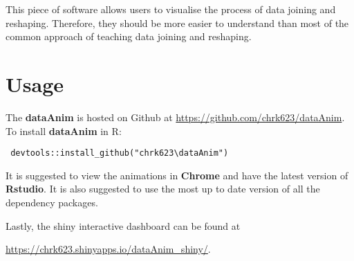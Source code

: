 This piece of software allows users to visualise the process of data joining and reshaping. Therefore, they should be more easier to understand than most of the common approach of teaching data joining and reshaping.


\newpage
\section{Usage}
The \textbf{dataAnim} is hosted on \textsf{Github} at \href{https://github.com/chrk623/dataAnim}{https://github.com/chrk623/dataAnim}. To install \textbf{dataAnim} in \textsf{R}:

\begin{lstlisting}
 devtools::install_github("chrk623\dataAnim")
\end{lstlisting}

It is suggested to view the animations in \textbf{Chrome} and have the latest version of \textbf{Rstudio}. It is also suggested to use the most up to date version of all the dependency packages.

Lastly, the shiny interactive dashboard can be found at 

\href{https://chrk623.shinyapps.io/dataAnim_shiny/}{https://chrk623.shinyapps.io/dataAnim\_shiny/}.


